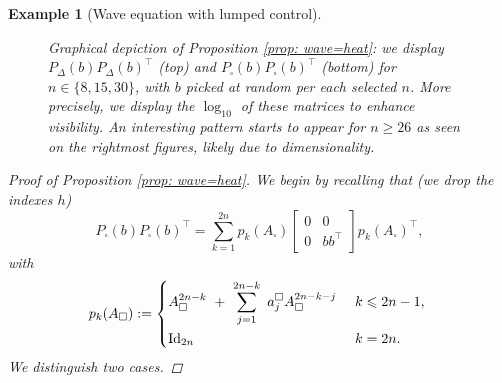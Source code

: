 \documentclass[journal,twoside,web]{ieeecolor}
\newtheorem{example}{Example}
\begin{document}
\begin{example}[Wave equation with lumped control]
\begin{figure}
	\caption{Graphical depiction of Proposition \ref{prop: wave=heat}: we display $P_{\Delta}(b)P_{\Delta}(b)^\top$ (top) and $P_{\square}(b)P_{\square}(b)^\top$ (bottom) for $n\in\{8, 15, 30\}$, with $b$ picked at random per each selected $n$. More precisely, we display the $\log_{10}$ of these matrices to enhance visibility. An interesting pattern starts to appear for $n\geqslant26$ as seen on the rightmost figures, likely due to dimensionality.}
	\end{figure}
	
	\begin{proof}[Proof of Proposition \ref{prop: wave=heat}]
	We begin by recalling that (we drop the indexes $h$)
	\begin{equation*}
	P_\square(b)P_\square(b)^\top = \sum_{k=1}^{2n} p_k(A_{\square}) \begin{bmatrix} 0 & 0\\
	0 & bb^\top\end{bmatrix} p_k(A_{\square})^\top,
	\end{equation*}
	with 
	\begin{equation*}
	p_k(A_{\square}) := \begin{dcases} A_\square^{2n-k} + \sum_{j=1}^{2n-k} a^\square_j A_\square^{2n-k-j}  &k\leqslant 2n-1, \\
	\mathrm{Id}_{2n} &k=2n.
	\end{dcases}
	\end{equation*}
	We distinguish two cases.
	\smallskip
	

\end{proof}
\end{example}
\end{document}
